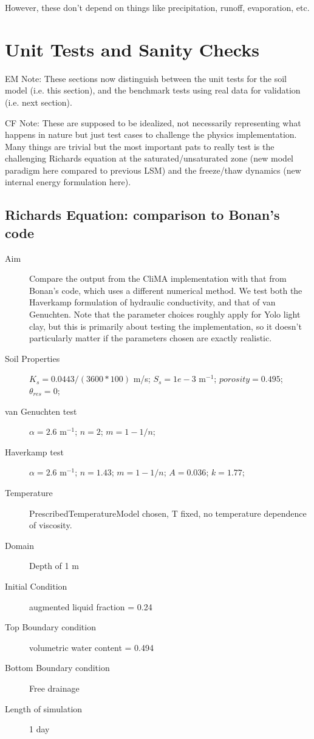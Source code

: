 \documentclass[twoside,10pt]{report}
\begin{document}
However, these don't depend on things like precipitation, runoff, evaporation, etc. 

\section{Unit Tests and Sanity Checks}

EM Note: These sections now distinguish between the unit tests for the soil model (i.e. this section), and the benchmark tests using real data for validation (i.e. next section).

CF Note: These are supposed to be idealized, not necessarily representing what happens in nature but just test cases to challenge the physics implementation. Many things are trivial but the most important pats to really test is the challenging Richards equation at the saturated/unsaturated zone (new model paradigm here compared to previous LSM) and the freeze/thaw dynamics (new internal energy formulation here).

\subsection{Richards Equation: comparison to Bonan's code}
\begin{description}
\item [Aim] Compare the output from the CliMA implementation with that from Bonan's code, which uses a different numerical method.  We test both the Haverkamp formulation of hydraulic conductivity, and that of van Genuchten. Note that the parameter choices roughly apply for Yolo light clay, but this is primarily about testing the implementation, so it doesn't particularly matter if the parameters chosen are exactly realistic.
\item [Soil Properties] $K_s = 0.0443 / (3600*100)$ m/s; $S_s = 1e-3$ m$^{-1}$; $porosity=0.495$; $\theta_{res}=0$;
\item [van Genuchten test]$\alpha = 2.6$ m$^{-1}$; $n = 2$; $m = 1-1/n$;
\item [Haverkamp test]$\alpha = 2.6$ m$^{-1}$; $n = 1.43$; $m = 1-1/n$; $A = 0.036$; $k = 1.77$;
\item [Temperature] PrescribedTemperatureModel chosen, T fixed, no temperature dependence of viscosity. 
\item [Domain] Depth of 1 m
\item [Initial Condition] augmented liquid fraction = 0.24
\item [Top Boundary condition] volumetric water content = 0.494
\item [Bottom Boundary condition] Free drainage
\item [Length of simulation] 1 day
\end{description}
\end{document}
